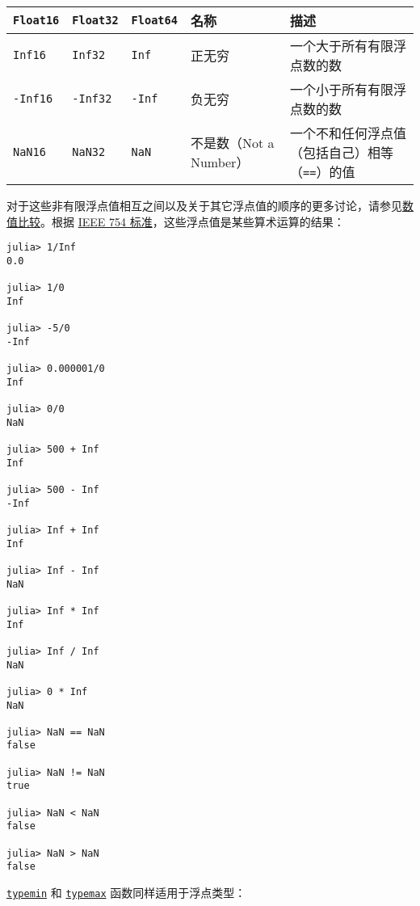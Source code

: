 \begin{table}[h]

\begin{tabulary}{\linewidth}{|L|L|L|L|L|}
\hline
\texttt{Float16} & \texttt{Float32} & \texttt{Float64} & 名称 & 描述 \\
\hline
\texttt{Inf16} & \texttt{Inf32} & \texttt{Inf} & 正无穷 & 一个大于所有有限浮点数的数 \\
\hline
\texttt{-Inf16} & \texttt{-Inf32} & \texttt{-Inf} & 负无穷 & 一个小于所有有限浮点数的数 \\
\hline
\texttt{NaN16} & \texttt{NaN32} & \texttt{NaN} & 不是数（Not a Number） & 一个不和任何浮点值（包括自己）相等（\texttt{==}）的值 \\
\hline
\end{tabulary}

\end{table}



对于这些非有限浮点值相互之间以及关于其它浮点值的顺序的更多讨论，请参见\hyperlink{7125151170457482788}{数值比较}。根据 \href{https://en.wikipedia.org/wiki/IEEE\_754-2008}{IEEE 754 标准}，这些浮点值是某些算术运算的结果：




\begin{verbatim}
julia> 1/Inf
0.0

julia> 1/0
Inf

julia> -5/0
-Inf

julia> 0.000001/0
Inf

julia> 0/0
NaN

julia> 500 + Inf
Inf

julia> 500 - Inf
-Inf

julia> Inf + Inf
Inf

julia> Inf - Inf
NaN

julia> Inf * Inf
Inf

julia> Inf / Inf
NaN

julia> 0 * Inf
NaN

julia> NaN == NaN
false

julia> NaN != NaN
true

julia> NaN < NaN
false

julia> NaN > NaN
false
\end{verbatim}



\hyperlink{3613894539247233488}{\texttt{typemin}} 和 \hyperlink{17760305803764597758}{\texttt{typemax}} 函数同样适用于浮点类型：




